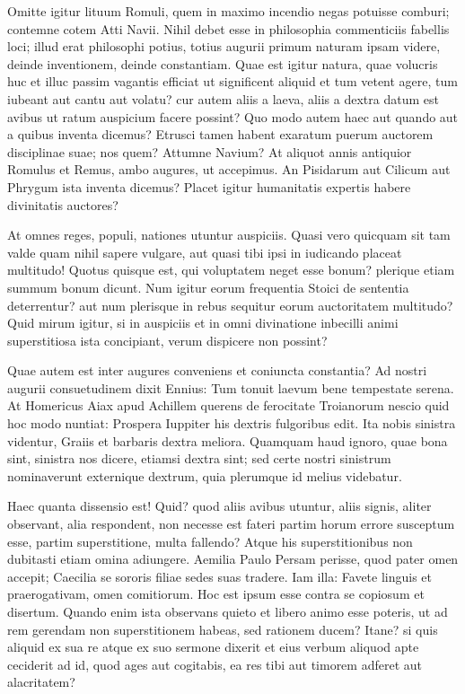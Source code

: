  Omitte igitur lituum Romuli, quem in maximo incendio negas potuisse comburi; contemne cotem Atti Navii. Nihil debet esse in philosophia commenticiis fabellis loci; illud erat philosophi potius, totius augurii primum naturam ipsam videre, deinde inventionem, deinde constantiam. Quae est igitur natura, quae volucris huc et illuc passim vagantis efficiat ut significent aliquid et tum vetent agere, tum iubeant aut cantu aut volatu? cur autem aliis a laeva, aliis a dextra datum est avibus ut ratum auspicium facere possint? Quo modo autem haec aut quando aut a quibus inventa dicemus? Etrusci tamen habent exaratum puerum auctorem disciplinae suae; nos quem? Attumne Navium? At aliquot annis antiquior Romulus et Remus, ambo augures, ut accepimus. An Pisidarum aut Cilicum aut Phrygum ista inventa dicemus? Placet igitur humanitatis expertis habere divinitatis auctores?

 At omnes reges, populi, nationes utuntur auspiciis. Quasi vero quicquam sit tam valde quam nihil sapere vulgare, aut quasi tibi ipsi in iudicando placeat multitudo! Quotus quisque est, qui voluptatem neget esse bonum? plerique etiam summum bonum dicunt. Num igitur eorum frequentia Stoici de sententia deterrentur? aut num plerisque in rebus sequitur eorum auctoritatem multitudo? Quid mirum igitur, si in auspiciis et in omni divinatione inbecilli animi superstitiosa ista concipiant, verum dispicere non possint?

 Quae autem est inter augures conveniens et coniuncta constantia? Ad nostri augurii consuetudinem dixit Ennius: Tum tonuit laevum bene tempestate serena. At Homericus Aiax apud Achillem querens de ferocitate Troianorum nescio quid hoc modo nuntiat: Prospera Iuppiter his dextris fulgoribus edit. Ita nobis sinistra videntur, Graiis et barbaris dextra meliora. Quamquam haud ignoro, quae bona sint, sinistra nos dicere, etiamsi dextra sint; sed certe nostri sinistrum nominaverunt externique dextrum, quia plerumque id melius videbatur.

 Haec quanta dissensio est! Quid? quod aliis avibus utuntur, aliis signis, aliter observant, alia respondent, non necesse est fateri partim horum errore susceptum esse, partim superstitione, multa fallendo? Atque his superstitionibus non dubitasti etiam omina adiungere. Aemilia Paulo Persam perisse, quod pater omen accepit; Caecilia se sororis filiae sedes suas tradere. Iam illa: Favete linguis et praerogativam, omen comitiorum. Hoc est ipsum esse contra se copiosum et disertum. Quando enim ista observans quieto et libero animo esse poteris, ut ad rem gerendam non superstitionem habeas, sed rationem ducem? Itane? si quis aliquid ex sua re atque ex suo sermone dixerit et eius verbum aliquod apte ceciderit ad id, quod ages aut cogitabis, ea res tibi aut timorem adferet aut alacritatem?


